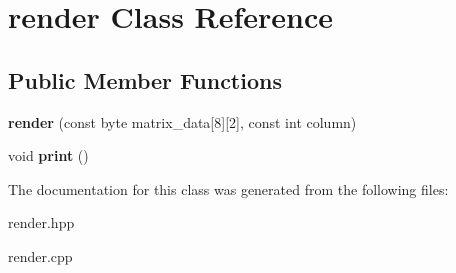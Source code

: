 \hypertarget{classrender}{}\section{render Class Reference}
\label{classrender}
\subsection*{Public Member Functions}
\begin{DoxyCompactItemize}
\item 
{\bfseries render} (const byte matrix\+\_\+data\mbox{[}8\mbox{]}\mbox{[}2\mbox{]}, const int column)\hypertarget{classrender_a24c87de5cd0a285d64f961b85739ebf0}{}\label{classrender_a24c87de5cd0a285d64f961b85739ebf0}

\item 
void {\bfseries print} ()\hypertarget{classrender_a569de1388c976ec5a78d83abd070fdd8}{}\label{classrender_a569de1388c976ec5a78d83abd070fdd8}

\end{DoxyCompactItemize}


The documentation for this class was generated from the following files\+:\begin{DoxyCompactItemize}
\item 
render.\+hpp\item 
render.\+cpp\end{DoxyCompactItemize}
